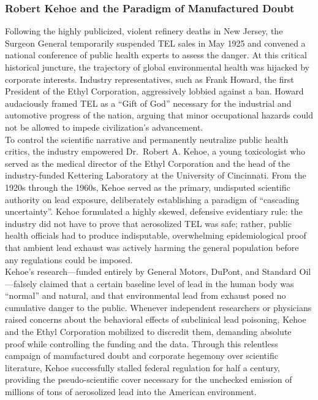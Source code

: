 \documentclass[
]{article}
\begin{document}
\subsubsection{\texorpdfstring{\textbf{Robert Kehoe and the Paradigm of
Manufactured
Doubt}}{Robert Kehoe and the Paradigm of Manufactured Doubt}}\label{robert-kehoe-and-the-paradigm-of-manufactured-doubt}

Following the highly publicized, violent refinery deaths in New Jersey,
the Surgeon General temporarily suspended TEL sales in May 1925 and
convened a national conference of public health experts to assess the
danger. At this critical historical juncture, the trajectory of global
environmental health was hijacked by corporate interests. Industry
representatives, such as Frank Howard, the first President of the Ethyl
Corporation, aggressively lobbied against a ban. Howard audaciously
framed TEL as a ``Gift of God'' necessary for the industrial and
automotive progress of the nation, arguing that minor occupational
hazards could not be allowed to impede civilization's advancement.\\
To control the scientific narrative and permanently neutralize public
health critics, the industry empowered Dr.~Robert A. Kehoe, a young
toxicologist who served as the medical director of the Ethyl Corporation
and the head of the industry-funded Kettering Laboratory at the
University of Cincinnati. From the 1920s through the 1960s, Kehoe served
as the primary, undisputed scientific authority on lead exposure,
deliberately establishing a paradigm of ``cascading uncertainty''. Kehoe
formulated a highly skewed, defensive evidentiary rule: the industry did
not have to prove that aerosolized TEL was safe; rather, public health
officials had to produce indisputable, overwhelming epidemiological
proof that ambient lead exhaust was actively harming the general
population before any regulations could be imposed.\\
Kehoe's research---funded entirely by General Motors, DuPont, and
Standard Oil---falsely claimed that a certain baseline level of lead in
the human body was ``normal'' and natural, and that environmental lead
from exhaust posed no cumulative danger to the public. Whenever
independent researchers or physicians raised concerns about the
behavioral effects of subclinical lead poisoning, Kehoe and the Ethyl
Corporation mobilized to discredit them, demanding absolute proof while
controlling the funding and the data. Through this relentless campaign
of manufactured doubt and corporate hegemony over scientific literature,
Kehoe successfully stalled federal regulation for half a century,
providing the pseudo-scientific cover necessary for the unchecked
emission of millions of tons of aerosolized lead into the American
environment.
\end{document}
